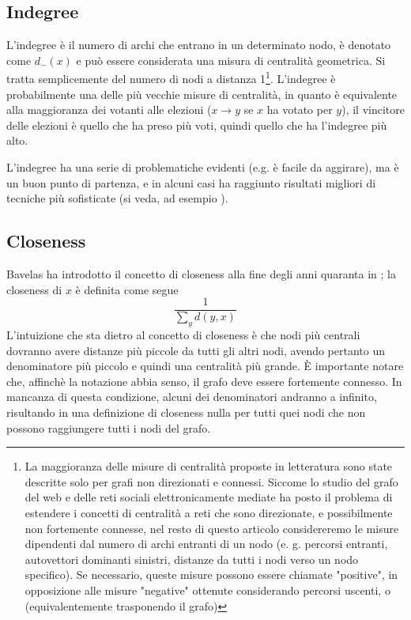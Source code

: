 \subsection{Indegree}
L'indegree è il numero di archi che entrano in un determinato nodo, è denotato come $d_-{(x)}$ e può essere considerata una misura di centralità geometrica. Si tratta semplicemente del numero di nodi a distanza 1\footnote{La maggioranza delle misure di centralità proposte in letteratura sono state descritte solo per grafi non direzionati e connessi. Siccome lo studio del grafo del web e delle reti sociali elettronicamente mediate ha posto il problema di estendere i concetti di centralità a reti che sono direzionate, e possibilmente non fortemente connesse, nel resto di questo articolo considereremo le misure dipendenti dal numero di archi entranti di un nodo (e. g. percorsi entranti, autovettori dominanti sinistri, distanze da tutti i nodi verso un nodo specifico). Se necessario, queste misure possono essere chiamate "positive", in opposizione alle misure "negative" ottenute considerando percorsi uscenti, o (equivalentemente trasponendo il grafo)}. L'indegree è probabilmente una delle più vecchie misure di centralità, in quanto è equivalente alla maggioranza dei votanti alle elezioni ($x \rightarrow y$ se $x$ ha votato per $y$), il vincitore delle elezioni è quello che ha preso più voti, quindi quello che ha l'indegree più alto.

L'indegree ha una serie di problematiche evidenti (e.g. è facile da aggirare), ma è un buon punto di partenza, e in alcuni casi ha raggiunto risultati migliori di tecniche più sofisticate (si veda, ad esempio \cite{degree}).
\subsection{Closeness}
Bavelas ha introdotto il concetto di closeness alla fine degli anni quaranta in \cite{bavelas}; la closeness di $x$ è definita come segue
\begin{equation}
	\frac{1}{\sum_y{d(y, x)}}
\end{equation}
L'intuizione che sta dietro al concetto di closeness è che nodi più centrali dovranno avere distanze più piccole da tutti gli altri nodi, avendo pertanto un denominatore più piccolo e quindi una centralità più grande. È importante notare che, affinchè la notazione abbia senso, il grafo deve essere fortemente connesso. In mancanza di questa condizione, alcuni dei denominatori andranno a infinito, risultando in una definizione di closeness nulla per tutti quei nodi che non possono raggiungere tutti i nodi del grafo.

